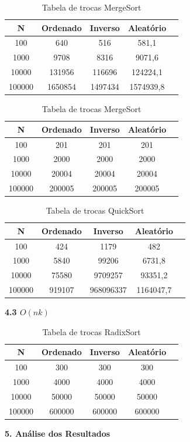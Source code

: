 \documentclass[10pt]{article}
\begin{document}
\begin{table}[H]
  \parbox{.45\linewidth}{
    \centering
    \caption{Tabela de trocas HeapSort}
    \begin{tabular}{|c|c|c|c|c|}
    \hline
    N & Ordenado & Inverso & Aleatório \\ \hline
    100 & 640 & 516 & 581,1 \\ \hline
    1000 & 9708 & 8316 & 9071,6 \\ \hline
    10000 & 131956 & 116696 & 124224,1 \\ \hline
    100000 & 1650854 & 1497434 & 1574939,8 \\ \hline
    \end{tabular}
  }
  \hfill
  \parbox{.45\linewidth}{
    \centering
    \caption{Tabela de trocas MergeSort}
    \begin{tabular}{|c|c|c|c|c|}
    \hline
    N & Ordenado & Inverso & Aleatório \\ \hline
    100 & 201 & 201 & 201 \\ \hline
    1000 & 2000 & 2000 & 2000 \\ \hline
    10000 & 20004 & 20004 & 20004 \\ \hline
    100000 & 200005 & 200005 & 200005 \\ \hline
    \end{tabular}
  }
\end{table}

\begin{table}[H]
  \centering
  \caption{Tabela de trocas QuickSort}
  \begin{tabular}{|c|c|c|c|c|}
  \hline
  N & Ordenado & Inverso & Aleatório \\ \hline
  100 & 424 & 1179 & 482 \\ \hline
  1000 & 5840 & 99206 & 6731,8 \\ \hline
  10000 & 75580 & 9709257 & 93351,2 \\ \hline
  100000 & 919107 & 968096337 & 1164047,7 \\ \hline
  \end{tabular}
\end{table}

\vspace{0.5cm}

\textbf{4.3 $O(n k)$}

\begin{table}[H]
  \centering
  \caption{Tabela de trocas RadixSort}
  \begin{tabular}{|c|c|c|c|c|}
  \hline
  N & Ordenado & Inverso & Aleatório \\ \hline
  100 & 300 & 300 & 300 \\ \hline
  1000 & 4000 & 4000 & 4000 \\ \hline
  10000 & 50000 & 50000 & 50000 \\ \hline
  100000 & 600000 & 600000 & 600000 \\ \hline
  \end{tabular}
\end{table}

\vspace{0.25cm}

\textbf{5. Análise dos Resultados}



\vspace{0.25cm}
\end{document}
